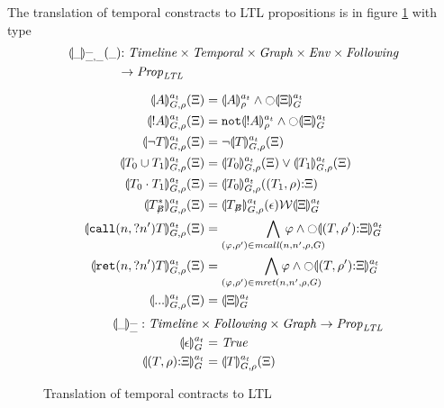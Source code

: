 \documentclass[preprint,onecolumn,9pt]{sigplanconf} %
\begin{document}
The translation of temporal constracts to LTL propositions is in figure \ref{fig:translation} with type
\begin{align*}
{\scriptsize \toltl{\_}{\_}{\_}{\_}{\_}} &{\scriptsize : \Timeline \times \TContract \times \Graph \times \Env \times \TConEnvStack}\\ & {\scriptsize \to \LTLProp}
\end{align*}
\begin{figure}
  \begin{align*}
   \toltl{\mtimeline}{\mevent}{\mgraph}{\menv}{\mtestack} &=
     \ltland{\denoteevent{\mevent}{\menv}{\mtimeline}}
            {\ltlnext{\stacktoltl{\mtimeline}{\mtestack}{\mgraph}}}
    \\
    \toltl{\mtimeline}{\snonevent{\mevent}}{\mgraph}{\menv}{\mtestack} &=
      \ltland{\apneg{\denoteevent{\snonevent{\mevent}}{\menv}{\mtimeline}}}
             {\ltlnext{\stacktoltl{\mtimeline}{\mtestack}{\mgraph}}}
    \\
    \toltl{\mtimeline}{\stnot{\mtcon}}{\mgraph}{\menv}{\mtestack} &=
      \ltlnot{\toltl{\mtimeline}{\mtcon}{\mgraph}{\menv}{\mtestack}}
    \\
    \toltl{\mtimeline}{\stOr{\mtcon_0}{\mtcon_1}}{\mgraph}{\menv}{\mtestack} &=
      \ltlor{\toltl{\mtimeline}{\mtcon_0}{\mgraph}{\menv}{\mtestack}}
            {\toltl{\mtimeline}{\mtcon_1}{\mgraph}{\menv}{\mtestack}}
    \\
    \toltl{\mtimeline}{\stseq{\mtcon_0}{\mtcon_1}}{\mgraph}{\menv}{\mtestack} &=
      \toltl{\mtimeline}{\mtcon_0}{\mgraph}{\menv}{\cons{(\mtcon_1,\menv)}{\mtestack}}
    \\
    \toltl{\mtimeline}{\stmany{\mtconNoB}}{\mgraph}{\menv}{\mtestack} &=
      \ltlW{\toltl{\mtimeline}{\mtconNoB}{\mgraph}{\menv}{\emptytestack}}{\stacktoltl{\mtimeline}{\mtestack}{\mgraph}}
    \\
    \toltl{\mtimeline}{\stcall{\mname}{\mname'}{\mtcon}}{\mgraph}{\menv}{\mtestack} &=
      \bigwedge\limits_{(\ltlprop,\menv') \in \matchcall(\mname,\mname',\menv,\mgraph)}{
        \mkern-60mu\ltland{\ltlprop}{\ltlnext{\stacktoltl{\mtimeline}{\cons{(\mtcon,\menv')}{\mtestack}}{\mgraph}}}}
    \\
    \toltl{\mtimeline}{\stret{\mname}{\mname'}{\mtcon}}{\mgraph}{\menv}{\mtestack} &=
      \bigwedge\limits_{(\ltlprop,\menv') \in \matchret(\mname,\mname',\menv,\mgraph)}{
        \mkern-60mu\ltland{\ltlprop}{\ltlnext{\stacktoltl{\mtimeline}{\cons{(\mtcon,\menv')}{\mtestack}}{\mgraph}}}}
    \\
      \toltl{\mtimeline}{\sddd}{\mgraph}{\menv}{\mtestack} &= \stacktoltl{\mtimeline}{\mtestack}{\mgraph}
\\[2pt]
    {\scriptsize \stacktoltl{\_}{\_}{\_} : \Timeline \times \TConEnvStack \times \Graph \to \LTLProp} \span\omit
\\
    \stacktoltl{\mtimeline}{\emptytestack}{\mgraph} &= \ltlTrue
\\
    \stacktoltl{\mtimeline}{\cons{(\mtcon,\menv)}{\mtestack}}{\mgraph} &=
      \toltl{\mtimeline}{\mtcon}{\mgraph}{\menv}{\mtestack}
  \end{align*}
  
  \caption{Translation of temporal contracts to LTL}
\label{fig:translation}
\end{figure}
\end{document}

